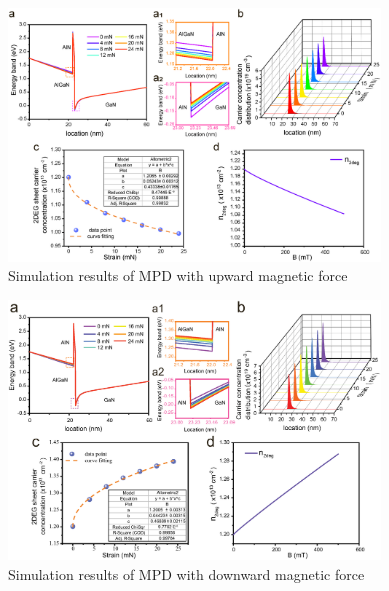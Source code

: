 \begin{figure}[H] 
\centering    
\includegraphics[width=0.88\textwidth]{ch2_MPD_theory_up}
\caption[Simulation results of MPD with upward magnetic force]{Simulation results of MPD with upward magnetic force}
\label{fig:ch2_MPD_theory_up}
\end{figure}

\begin{figure}[H] 
\centering    
\includegraphics[width=0.88\textwidth]{ch2_MPD_theory_down}
\caption[Simulation results of MPD with downward magnetic force]{Simulation results of MPD with downward magnetic force}
\label{fig:ch2_MPD_theory_down}
\end{figure}


